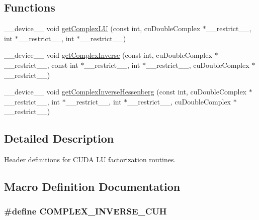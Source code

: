\subsection*{Functions}
\begin{DoxyCompactItemize}
\item 
\+\_\+\+\_\+device\+\_\+\+\_\+ void \hyperlink{complexInverse_8cuh_a0ad068d6b29da927683f996d74322528}{get\+Complex\+LU} (const int, cu\+Double\+Complex $\ast$\+\_\+\+\_\+restrict\+\_\+\+\_\+, int $\ast$\+\_\+\+\_\+restrict\+\_\+\+\_\+, int $\ast$\+\_\+\+\_\+restrict\+\_\+\+\_\+)
\item 
\+\_\+\+\_\+device\+\_\+\+\_\+ void \hyperlink{complexInverse_8cuh_ac15ce39b4ae91d5178d04a8f6318714a}{get\+Complex\+Inverse} (const int, cu\+Double\+Complex $\ast$\+\_\+\+\_\+restrict\+\_\+\+\_\+, const int $\ast$\+\_\+\+\_\+restrict\+\_\+\+\_\+, int $\ast$\+\_\+\+\_\+restrict\+\_\+\+\_\+, cu\+Double\+Complex $\ast$\+\_\+\+\_\+restrict\+\_\+\+\_\+)
\item 
\+\_\+\+\_\+device\+\_\+\+\_\+ void \hyperlink{complexInverse_8cuh_aaa0897f23eb6101fb0fe703ddbd93b56}{get\+Complex\+Inverse\+Hessenberg} (const int, cu\+Double\+Complex $\ast$\+\_\+\+\_\+restrict\+\_\+\+\_\+, int $\ast$\+\_\+\+\_\+restrict\+\_\+\+\_\+, int $\ast$\+\_\+\+\_\+restrict\+\_\+\+\_\+, cu\+Double\+Complex $\ast$\+\_\+\+\_\+restrict\+\_\+\+\_\+)
\end{DoxyCompactItemize}


\subsection{Detailed Description}
Header definitions for C\+U\+DA LU factorization routines. 



\subsection{Macro Definition Documentation}
\subsubsection[{\texorpdfstring{C\+O\+M\+P\+L\+E\+X\+\_\+\+I\+N\+V\+E\+R\+S\+E\+\_\+\+C\+UH}{COMPLEX_INVERSE_CUH}}]{\setlength{\rightskip}{0pt plus 5cm}\#define C\+O\+M\+P\+L\+E\+X\+\_\+\+I\+N\+V\+E\+R\+S\+E\+\_\+\+C\+UH}\hypertarget{complexInverse_8cuh_a31ab82ad484c489345092056a631004d}{}\label{complexInverse_8cuh_a31ab82ad484c489345092056a631004d}



